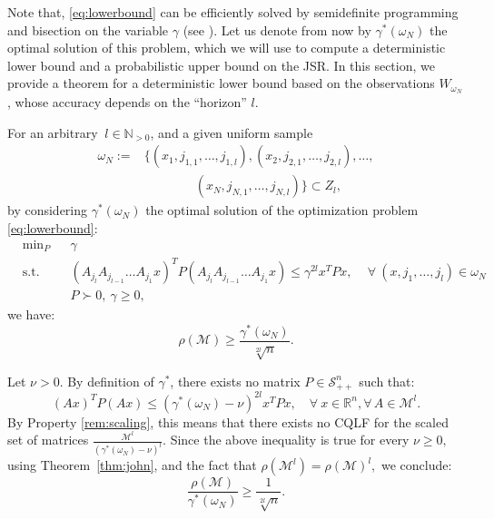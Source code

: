 Note that, \eqref{eq:lowerbound} can be efficiently solved by semidefinite programming and bisection on the variable $\gamma$ (see \cite{boyd}). Let us denote from now by $\gamma^*(\omega_N)$ the optimal solution of this problem, which we will use to compute a deterministic lower bound and a probabilistic upper bound on the JSR. In this section, we provide a theorem for a deterministic lower bound based on the observations $W_{\omega_N}$, whose accuracy depends on the ``horizon'' $l$.
\begin{thm}\label{thm:lowerbound}
For an arbitrary $\ l \in \mathbb{N}_{>0}$, and a given uniform sample 
\begin{equation*}
\begin{aligned}
\omega_N := & \{(x_1, j_{1,1},\dots,j_{1,l}), (x_2, j_{2,1},\dots,j_{2,l}), \ldots,\\
           & \qquad \qquad (x_N, j_{N,1},\dots,j_{N,l})\} \subset Z_l,
\end{aligned}
\end{equation*}
by considering $\gamma^*(\omega_N)$ the optimal solution of the optimization problem \eqref{eq:lowerbound}:
\begin{equation*}
\begin{aligned}
& \text{min}_P & & \gamma \\
& \text{s.t.} 
&  & (A_{j_l} A_{j_{l-1}} \dots A_{j_1} x)^T P (A_{j_l} A_{j_{l-1}} \dots A_{j_1} x) \leq \gamma^{2l} x^T P x, \,  \quad \forall\ (x, j_1,\dots, j_l) \in \omega_N\\
& && P \succ 0,\ \gamma \geq 0,
\end{aligned}
\end{equation*}
we have:
$$\rho(\mathcal{M}) \geq \frac{\gamma^*(\omega_N)}{\sqrt[2l]{n}}.$$ 
\end{thm}
\begin{pf}
Let $\nu >0$. By definition of $\gamma^*$,  there exists no matrix $P \in \mathcal{S}^n_{++}$ such that:
\begin{equation*}
(Ax)^T P (Ax) \leq (\gamma^*(\omega_N) -\nu)^{2l} x^T P x,\quad \forall\ x \in \mathbb{R}^n, \forall\, A \in \mathcal{M}^{l}.
\end{equation*}
By Property \ref{rem:scaling}, this means that there exists no CQLF for the scaled set of matrices $\frac{\mathcal{M}^l}{(\gamma^*(\omega_N)-\nu)^l}$. Since the above inequality is true for every $\nu \geq 0,$ using Theorem~\ref{thm:john}, and the fact that $\rho(\mathcal{M}^l)=\rho(\mathcal{M})^l,$ we conclude:
\begin{equation*}
\frac{\rho(\mathcal{M})}{\gamma^*(\omega_N)} \geq \frac{1}{\sqrt[2l]{n}}.
\end{equation*}
\end{pf}